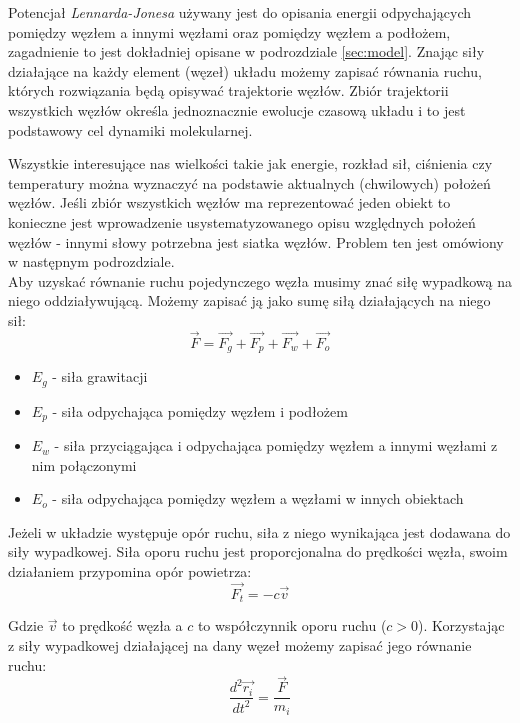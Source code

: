 \documentclass[12pt, letterpaper]{report}
\begin{document}
    Potencjał \emph{Lennarda-Jonesa} używany jest do opisania 
    energii odpychających pomiędzy węzłem a innymi węzłami oraz pomiędzy węzłem a podłożem, zagadnienie 
    to jest dokładniej opisane w podrozdziale \ref{sec:model}.
    Znając siły działające na każdy element (węzeł) układu możemy zapisać równania ruchu, 
    których rozwiązania będą opisywać trajektorie węzłów. 
    Zbiór trajektorii wszystkich węzłów określa jednoznacznie ewolucje czasową układu
    i to jest podstawowy cel dynamiki molekularnej. 

    Wszystkie interesujące nas wielkości 
    takie jak energie, rozkład sił, ciśnienia czy temperatury można wyznaczyć 
    na podstawie aktualnych (chwilowych) położeń węzłów.
    Jeśli zbiór wszystkich węzłów ma reprezentować jeden obiekt to konieczne jest 
    wprowadzenie usystematyzowanego opisu względnych położeń węzłów - innymi słowy 
    potrzebna jest siatka węzłów. Problem ten jest omówiony w następnym podrozdziale. \\

    Aby uzyskać równanie ruchu pojedynczego węzła musimy znać siłę wypadkową na niego oddziaływującą.
    Możemy zapisać ją jako sumę siłą działających na niego sił:
    \begin{equation}
        \vec{F} = \vec{F_{g}} + \vec{F_{p}} + \vec{F_{w}} + \vec{F_{o}}
    \end{equation}

    \begin{itemize}
        \item $E_{g}$ - siła grawitacji
        \item $E_{p}$ - siła odpychająca pomiędzy węzłem i podłożem
        \item $E_{w}$ - siła przyciągająca i odpychająca pomiędzy węzłem a innymi węzłami z nim połączonymi
        \item $E_{o}$ - siła odpychająca pomiędzy węzłem a węzłami w innych obiektach
    \end{itemize}

    Jeżeli w układzie występuje opór ruchu, siła z niego wynikająca
    jest dodawana do siły wypadkowej.
    Siła oporu ruchu jest proporcjonalna do prędkości węzła,
    swoim działaniem przypomina opór powietrza:
    \begin{equation}
        \vec{F_{t}} = - c \vec{v}
    \end{equation}

    Gdzie $\vec{v}$ to prędkość węzła a $c$ to współczynnik oporu ruchu ($c > 0$).
    Korzystając z siły wypadkowej działającej na dany węzeł możemy zapisać jego równanie ruchu:
    \begin{equation}
        \frac{d^{2} \vec{r_i}}{dt^{2}} = \frac{\vec{F}}{m_i}
    \end{equation}
\end{document}
